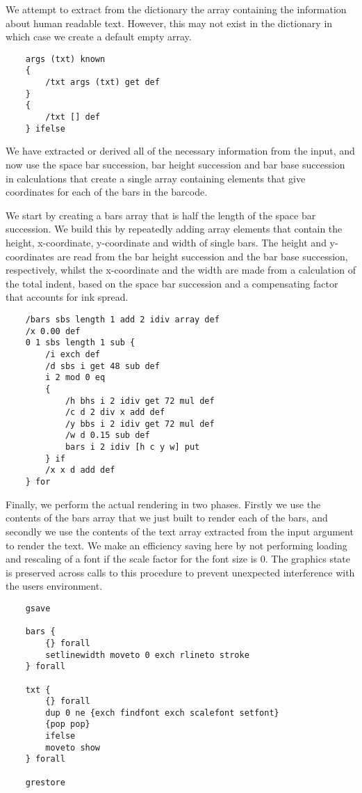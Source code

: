 \documentclass{article}
\begin{document}
We attempt to extract from the dictionary the array containing the
information about human readable text. However, this may not exist 
in the dictionary in which case we create a default empty array.

\begin{lstlisting}
    args (txt) known
    {
        /txt args (txt) get def
    }
    {
        /txt [] def
    } ifelse
\end{lstlisting}

We have extracted or derived all of the necessary information 
from the input, and now use the space bar succession, bar height 
succession and bar base succession in calculations that create a 
single array containing elements that give coordinates for each of
the bars in the barcode.

We start by creating a bars array that is half the length of the 
space bar succession. We build this by repeatedly adding array elements 
that contain the height, x-coordinate, y-coordinate and width of
single bars. The height and y-coordinates are read from the bar
height succession and the bar base succession, respectively, whilst
the x-coordinate and the width are made from a calculation of the 
total indent, based on the space bar succession and a compensating
factor that accounts for ink spread.

\begin{lstlisting}    
    /bars sbs length 1 add 2 idiv array def
    /x 0.00 def
    0 1 sbs length 1 sub {
        /i exch def
        /d sbs i get 48 sub def
        i 2 mod 0 eq
        {
            /h bhs i 2 idiv get 72 mul def
            /c d 2 div x add def
            /y bbs i 2 idiv get 72 mul def
            /w d 0.15 sub def            
            bars i 2 idiv [h c y w] put
        } if
        /x x d add def  
    } for
\end{lstlisting}

Finally, we perform the actual rendering in two phases. Firstly we
use the contents of the bars array that we just built to render each 
of the bars, and secondly we use the contents of the text array 
extracted from the input argument to render the
text. We make an efficiency saving here by not performing loading and
rescaling of a font if the scale factor for the font size is 0. The graphics
state is preserved across calls to this procedure to prevent 
unexpected interference with the users environment.

\begin{lstlisting}
    gsave
    
    bars {
        {} forall
        setlinewidth moveto 0 exch rlineto stroke
    } forall
    
    txt {
        {} forall
        dup 0 ne {exch findfont exch scalefont setfont} 
        {pop pop} 
        ifelse
        moveto show
    } forall

    grestore
\end{lstlisting}
\end{document}
